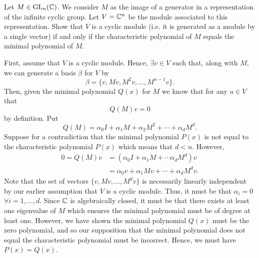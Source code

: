 \documentclass[leqno]{article}
\begin{document}
\newpage
\begin{problem}
Let $M\in \mathrm{GL}_{n}(\mathbb{C})$. We consider $M$ as the image of a generator in a representation of the infinite cyclic group. Let $V=\mathbb{C}^n$ be the module associated to this representation. Show that $V$ is a cyclic module (i.e. it is generated as a module by a single vector) if and only if the characteristic polynomial of $M$ equals the minimal polynomial of $M$.
\end{problem}
\begin{solution}
First, assume that $V$ is a cyclic module. Hence, $\exists v\in V$ such that, along with $M$, we can generate a basis $\beta$ for $V$ by
\[
\beta = \{v, Mv, M^2v, \dots, M^{n-1}v\}.
\]
Then, given the minimal polynomial $Q(x)$ for $M$ we know that for any $u\in V$ that
\[
Q(M)v=0
\]
by definition.  Put
\[
Q(M) = \alpha_0 I + \alpha_1 M + \alpha_2 M^2 + \cdots + \alpha_{d}M^d.
\]
Suppose for a contradiction that the minimal polynomial $P(x)$ is not equal to the characteristic polynomial $P(x)$ which means that $d<n$.  However,
\begin{align*}
    0=Q(M)v &= (\alpha_0 I + \alpha_1 M + \cdots \alpha_d M^d)v\\
    &= \alpha_0 v + \alpha_1 Mv + \cdots + \alpha_d M^d v.
\end{align*}
Note that the set of vectors $\{v, Mv,\dots, M^dv\}$ is necessarily linearly independent by our earlier assumption that $V$ is a cyclic module.  Thus, it must be that $\alpha_i = 0$ $\forall i=1,\dots,d$. Since $\mathbb{C}$ is algebraically closed, it must be that there exists at least one eigenvalue of $M$ which ensures the minimal polynomial must be of degree at least one.  However, we have shown the minimal polynomial $Q(x)$ must be the zero polynomial, and so our supposition that the minimal polynomial does not equal the characteristic polynomial must be incorrect. Hence, we must have $P(x)=Q(x)$.


\end{solution}
\end{document}
